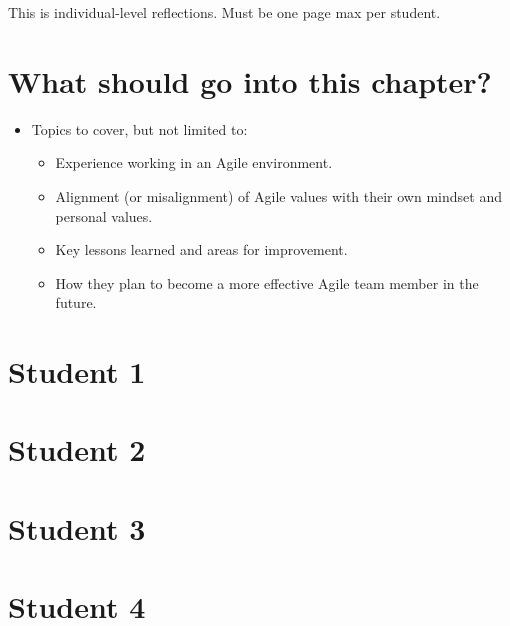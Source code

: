 
\noindent This is individual-level reflections. Must be one page max per student.

\section{What should go into this chapter?}

\begin{itemize}

    \item [-] Topics to cover, but not limited to:

    \begin{itemize}
        \item Experience working in an Agile environment.
        \item Alignment (or misalignment) of Agile values with their own mindset and personal values.
        \item Key lessons learned and areas for improvement.
        \item How they plan to become a more effective Agile team member in the future.
    \end{itemize}

\end{itemize}

\section{Student 1}
\section{Student 2}
\section{Student 3}
\section{Student 4}